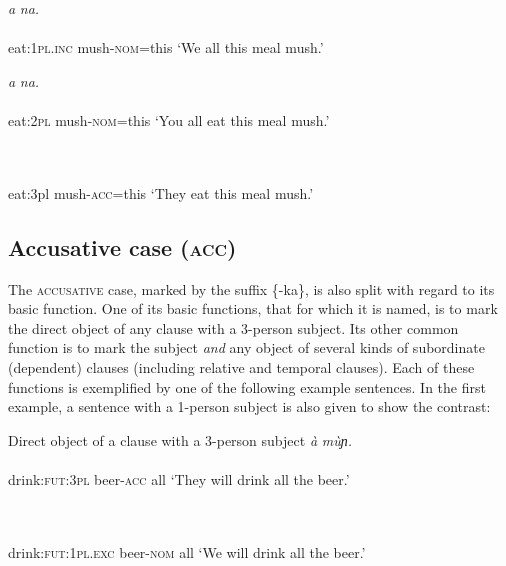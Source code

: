 \ea\label{ex:}
\textit{a}\textit{ na.} \\
    \\
eat:\textsc{1pl.inc}   mush-\textsc{nom}=this
\glt ‘We all this meal mush.’ 
\z




\ea\label{ex:}
\textit{a}\textit{ na.} \\
    \\
eat:\textsc{2pl}   mush-\textsc{nom}=this
\glt ‘You all eat this meal mush.’ 
\z




\ea\label{ex:}
 \\
    \\
eat:3pl   mush-\textsc{acc}=this
\glt ‘They eat this meal mush.’ 
\z






\subsection{Accusative case (\textsc{acc})}


The \textsc{accusative} case, marked by the suffix \{-ka\}, is also split with regard to its basic function. One of its basic functions, that for which it is named, is to mark the direct object of any clause with a 3-person subject. Its other common function is to mark the subject \textit{and} any object of several kinds of subordinate (dependent) clauses (including relative and temporal clauses). Each of these functions is exemplified by one of the following example sentences. In the first example, a sentence with a 1-person subject is also given to show the contrast:




Direct object of a clause with a 3-person subject
\ea\label{ex:}
\textit{à}\textit{   mùɲ.} \\
    \\
drink:\textsc{fut:3pl}   beer-\textsc{acc}   all
\glt ‘They will drink all the beer.’ 
\z




\ea\label{ex:}
 \\
    \\
drink:\textsc{fut:1pl.exc}   beer-\textsc{nom}   all
\glt ‘We will drink all the beer.’ 
\z





